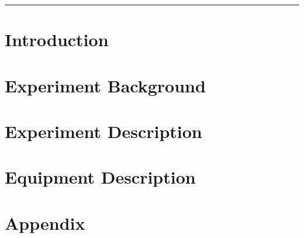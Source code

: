 \documentclass[11pt,letterpaper]{article}
\begin{document}
\begin{spacing}{1.1}




%


\tableofcontents
{}
\vspace{10pt}
\hrule
\clearpage
\begin{multicols}{2}

\section{Introduction} \label{section_intro}	                
\clearpage
\section{Experiment Background} \label{section_methods}	        
\clearpage
\section{Experiment Description} \label{section_results}	    
\clearpage
\section{Equipment Description} \label{section_discussion}	    
\clearpage
\end{multicols}

\section{Appendix}  \label{section_appendix}                     


\clearpage
\nocite{*} %
\clearpage



\cleardoublepage
\end{spacing}
\end{document}
